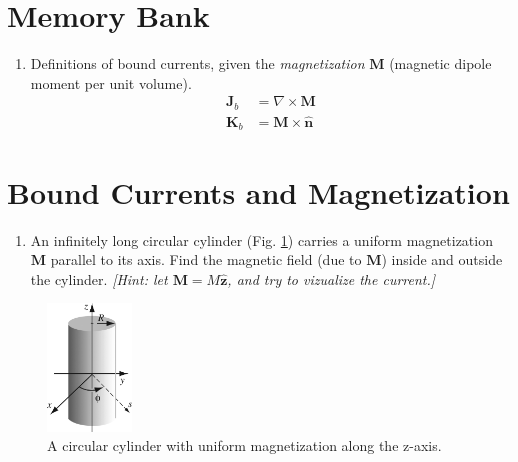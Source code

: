 \documentclass[12pt]{article}
\begin{document}
\maketitle
\small
\section{Memory Bank}
\begin{enumerate}
\item Definitions of bound currents, given the \textit{magnetization} $\mathbf{M}$ (magnetic dipole moment per unit volume).
\begin{align}
\mathbf{J}_b &= \nabla \times \mathbf{M} \\
\mathbf{K}_b &= \mathbf{M} \times \hat{\mathbf{n}}
\end{align}
\end{enumerate}

\section{Bound Currents and Magnetization}

\begin{enumerate}
\item An infinitely long circular cylinder (Fig. \ref{fig:1}) carries a uniform magnetization $\mathbf{M}$ parallel to its axis.  Find the magnetic field (due to $\mathbf{M}$) inside and outside the cylinder.  \textit{[Hint: let $\mathbf{M} = M\hat{\mathbf{z}}$, and try to vizualize the current.]}
\end{enumerate}

\begin{figure}
\centering
\includegraphics[width=0.2\textwidth]{figures/6_13.jpg}
\caption{\label{fig:1} A circular cylinder with uniform magnetization along the z-axis.}
\end{figure}
\end{document}
